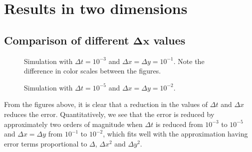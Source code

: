 \section{Results in two dimensions}

\subsection{Comparison of different \(\boldsymbol{\Delta x}\) values}

\begin{figure}[H]

\caption{Simulation with \(\Delta t = 10^{-3}\) and \(\Delta x = \Delta y = 10^{-1}\). Note the difference in color scales between the figures.}
\end{figure}

\begin{figure}[H]

\caption{Simulation with \(\Delta t = 10^{-5}\) and \(\Delta x = \Delta y = 10^{-2}\).}
\end{figure}

From the figures above, it is clear that a reduction in the values of \(\Delta t\) and \(\Delta x\) reduces the error. Quantitatively, we see that the error is reduced by approximately two orders of magnitude when \(\Delta t\) is reduced from \(10^{-3}\) to \(10^{-5}\) and \(\Delta x = \Delta y\) from \(10^{-1}\) to \(10^{-2}\), which fits well with the approximation having error terms proportional to \(\Delta\), \(\Delta x^2\) and \(\Delta y^2\).
